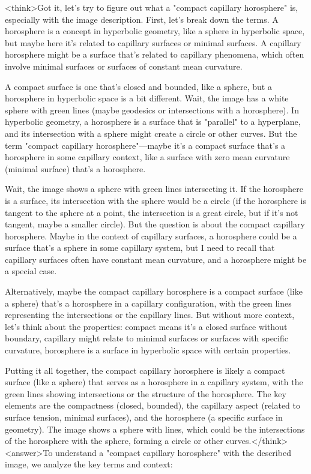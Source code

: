 <think>Got it, let's try to figure out what a "compact capillary horosphere" is, especially with the image description. First, let's break down the terms. A horosphere is a concept in hyperbolic geometry, like a sphere in hyperbolic space, but maybe here it's related to capillary surfaces or minimal surfaces. A capillary horosphere might be a surface that's related to capillary phenomena, which often involve minimal surfaces or surfaces of constant mean curvature. 

A compact surface is one that's closed and bounded, like a sphere, but a horosphere in hyperbolic space is a bit different. Wait, the image has a white sphere with green lines (maybe geodesics or intersections with a horosphere). In hyperbolic geometry, a horosphere is a surface that is "parallel" to a hyperplane, and its intersection with a sphere might create a circle or other curves. But the term "compact capillary horosphere"—maybe it's a compact surface that's a horosphere in some capillary context, like a surface with zero mean curvature (minimal surface) that's a horosphere. 

Wait, the image shows a sphere with green lines intersecting it. If the horosphere is a surface, its intersection with the sphere would be a circle (if the horosphere is tangent to the sphere at a point, the intersection is a great circle, but if it's not tangent, maybe a smaller circle). But the question is about the compact capillary horosphere. Maybe in the context of capillary surfaces, a horosphere could be a surface that's a sphere in some capillary system, but I need to recall that capillary surfaces often have constant mean curvature, and a horosphere might be a special case. 

Alternatively, maybe the compact capillary horosphere is a compact surface (like a sphere) that's a horosphere in a capillary configuration, with the green lines representing the intersections or the capillary lines. But without more context, let's think about the properties: compact means it's a closed surface without boundary, capillary might relate to minimal surfaces or surfaces with specific curvature, horosphere is a surface in hyperbolic space with certain properties. 

Putting it all together, the compact capillary horosphere is likely a compact surface (like a sphere) that serves as a horosphere in a capillary system, with the green lines showing intersections or the structure of the horosphere. The key elements are the compactness (closed, bounded), the capillary aspect (related to surface tension, minimal surfaces), and the horosphere (a specific surface in geometry). The image shows a sphere with lines, which could be the intersections of the horosphere with the sphere, forming a circle or other curves.</think><answer>To understand a "compact capillary horosphere" with the described image, we analyze the key terms and context:  

